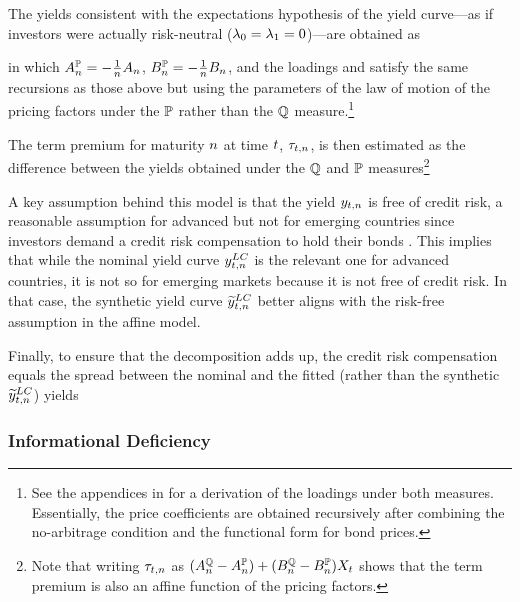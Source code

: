 {The yields consistent with the expectations hypothesis of the yield curve---as if investors were actually risk-neutral (\(\lambda_{0} = \lambda_{1} = 0\))---are obtained as
	
\noindent in which \(A_{n}^{\mathbb{P}} = - \frac{1}{n} A_{n}\), \(B_{n}^{\mathbb{P}} = - \frac{1}{n} B_{n}\), and the loadings  and  satisfy the same recursions as those above but using the parameters of the law of motion of the pricing factors under the \(\mathbb{P}\) rather than the \(\mathbb{Q}\) measure.\footnote{ See the appendices in \cite{Lloyd:2020} for a derivation of the loadings under both measures. Essentially, the price coefficients are obtained recursively after combining the no-arbitrage condition and the functional form for bond prices.}

The term premium for maturity \(n\) at time \(t\), \(\tau_{t,n}\), is then estimated as the difference between the yields obtained under the \(\mathbb{Q}\) and \(\mathbb{P}\) measures\footnote{ Note that writing \(\tau_{t,n}\) as \( (A_{n}^{\mathbb{Q}} - A_{n}^{\mathbb{P}}) + (B_{n}^{\mathbb{Q}}  - B_{n}^{\mathbb{P}}) X_{t} \) shows that the term premium is also an affine function of the pricing factors.}
	
A key assumption behind this model is that the yield \(y_{t,n}\) is free of credit risk, a reasonable assumption for advanced but not for emerging countries since investors demand a credit risk compensation to hold their bonds \citep{DuSchreger:2016JoF}. 
This implies that while the nominal yield curve \(y_{t,n} ^{LC}\) is the relevant one for advanced countries, it is not so for emerging markets because it is not free of credit risk.
In that case, the synthetic yield curve \(\widetilde{y}_{t,n} ^{LC}\) better aligns with the risk-free assumption in the affine model.

Finally, to ensure that the decomposition adds up, the credit risk compensation equals the spread between the nominal 
and the fitted (rather than the synthetic \(\widetilde{y}_{t,n} ^{LC}\)) yields %
	

\subsubsection{Informational Deficiency} \label{sec:Identification}
\iftoggle{toclinks}{\gototoc}{} %

}
